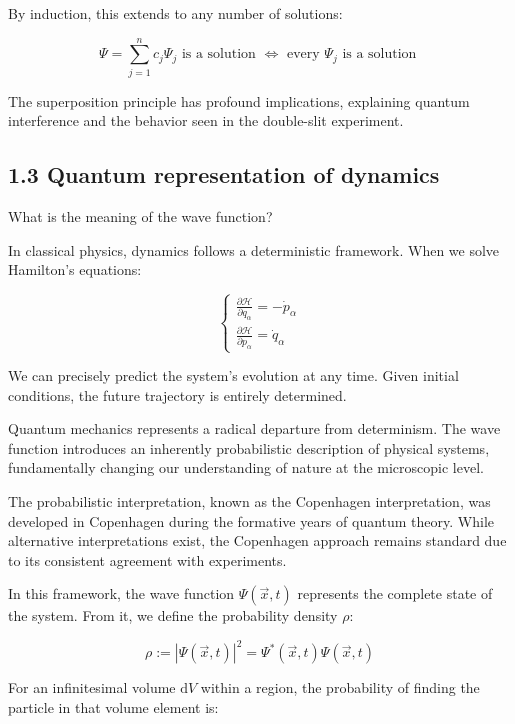 \documentclass[italian]{HKNdocument}
\begin{document}
By induction, this extends to any number of solutions:

\begin{equation*}
\Psi=\sum_{j=1}^{n} c_{j} \Psi_{j} \text{ is a solution } \Longleftrightarrow \text{ every } \Psi_{j} \text{ is a solution } \tag{1.21}
\end{equation*}

The superposition principle has profound implications, explaining quantum interference and the behavior seen in the double-slit experiment.

\subsection*{1.3 Quantum representation of dynamics}
What is the meaning of the wave function?

In classical physics, dynamics follows a deterministic framework. When we solve Hamilton's equations:

\[
\left\{\begin{array}{l}
\frac{\partial \mathcal{H}}{\partial q_{\alpha}}=-\dot{p}_{\alpha}  \tag{1.22}\\
\frac{\partial \mathcal{H}}{\partial p_{\alpha}}=\dot{q}_{\alpha}
\end{array}\right.
\]

We can precisely predict the system's evolution at any time. Given initial conditions, the future trajectory is entirely determined.

Quantum mechanics represents a radical departure from determinism. The wave function introduces an inherently probabilistic description of physical systems, fundamentally changing our understanding of nature at the microscopic level.

The probabilistic interpretation, known as the Copenhagen interpretation, was developed in Copenhagen during the formative years of quantum theory. While alternative interpretations exist, the Copenhagen approach remains standard due to its consistent agreement with experiments.

In this framework, the wave function $\Psi(\vec{x}, t)$ represents the complete state of the system. From it, we define the probability density $\rho$:

\begin{equation*}
\rho:=|\Psi(\vec{x}, t)|^{2} = \Psi^*(\vec{x}, t)\Psi(\vec{x}, t) \tag{1.23}
\end{equation*}

For an infinitesimal volume $\mathrm{d}V$ within a region, the probability of finding the particle in that volume element is:
\end{document}
